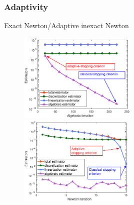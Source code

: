 \begin{frame}
\frametitle{Adaptivity}
\hspace{5.5 cm} Exact Newton/Adaptive inexact Newton \hspace{3.5 cm } 
\begin{figure}
   \centering
\includegraphics[width=0.50\textwidth]{fig_article_chap_1/exact_adapt_res_estimators_gmres_iter_first_newton_iter_Hmax_015.eps}    
\includegraphics[width=0.49\textwidth]{fig_article_chap_1/exact_adapt_resolution_estimators_newton_iter_Hmax_015.eps} 
\end{figure}
\end{frame}

